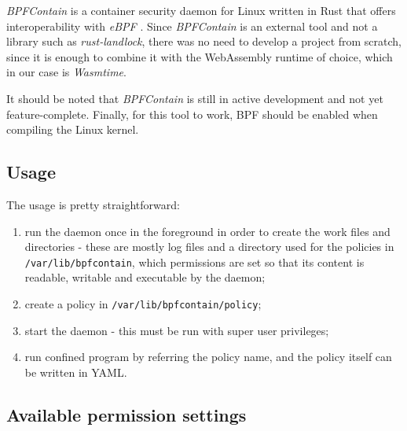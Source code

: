 \textit{BPFContain} \cite{bpfcontain} is a container security daemon for Linux written in Rust that offers
interoperability with \textit{eBPF} \cite{ebpf}.
Since \textit{BPFContain} is an external tool and not a library such as \textit{rust-landlock}, there was no need
to develop a project from scratch, since it is enough to combine it with the WebAssembly runtime of choice, which
in our case is \textit{Wasmtime}.

It should be noted that \textit{BPFContain} is still in active development and not yet feature-complete.
Finally, for this tool to work, BPF should be enabled when compiling the Linux kernel.

\subsection{Usage}

The usage is pretty straightforward:
\begin{enumerate}
  \item run the daemon once in the foreground in order to create the work files and directories -
        these are mostly log files and a directory used for the policies in \texttt{/var/lib/bpfcontain},
        which permissions are set so that its content is readable, writable and executable by the daemon;
  \item create a policy in \texttt{/var/lib/bpfcontain/policy};
  \item start the daemon - this must be run with super user privileges;
  \item run confined program by referring the policy name, and the policy itself can be written in YAML.
\end{enumerate}

\subsection{Available permission settings}

